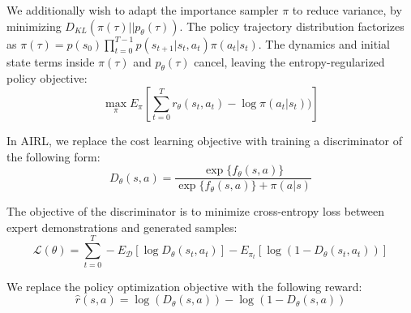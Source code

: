 \documentclass{article} \usepackage{iclr2018_conference,times}
\begin{document}
We additionally wish to adapt the importance sampler $\pi$ to reduce variance, by minimizing $D_{KL}(\pi(\tau) || p_\theta(\tau))$. The policy trajectory distribution factorizes as $\pi(\tau) = p(s_0)\prod_{t=0}^{T-1} p(s_{t+1}|s_t, a_t) \pi(a_t|s_t)$. The dynamics and initial state terms inside $\pi(\tau)$ and $p_\theta(\tau)$ cancel, leaving the entropy-regularized policy objective:
\begin{equation}
\label{eqn:gcl_pol_obj}
\max_\pi E_{\pi}[\sum_{t=0}^T r_\theta(s_t,a_t) - \log \pi(a_t|s_t))]
\end{equation}




In AIRL, we replace the cost learning objective with training a discriminator of the following form:
\begin{equation}
\label{eqn:discrim_advantage}
D_\theta(s,a) = \frac{\exp\{f_\theta(s,a)\}}{\exp\{f_\theta(s,a)\}+\pi(a|s)}
\end{equation}


The objective of the discriminator is to minimize cross-entropy loss between expert demonstrations and generated samples:
\[
\mathcal{L}(\theta) = \sum_{t=0}^T -E_{\mathcal{D}}\left[\log D_\theta(s_t,a_t)\right] - E_{\pi_t}\left[ \log(1-D_\theta(s_t,a_t))\right]
\]

We replace the policy optimization objective with the following reward:
\[
\hat{r}(s,a) = \log(D_\theta(s,a)) - \log(1-D_\theta(s,a))
\]
\end{document}
